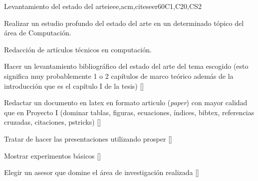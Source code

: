\begin{syllabus}
\begin{unit}{Levantamiento del estado del arte}{}{ieee,acm,citeseer}{60}{C1,C20,CS2}
  \begin{topics}
      \item Realizar un estudio profundo del estado del arte en un determinado tópico del área de Computación.
      \item Redacción de artículos técnicos en computación.
  \end{topics}
  \begin{learningoutcomes}
      \item Hacer un levantamiento bibliográfico del estado del arte del tema escogido (esto significa muy probablemente 1 o 2 capítulos de marco teórico además de la introducción que es el capítulo I de la tesis) [\Usage]
      \item Redactar un documento en latex en formato articulo (\emph{paper}) con mayor calidad que en Proyecto I (dominar tablas, figuras, ecuaciones, índices, bibtex, referencias cruzadas, citaciones, pstricks) [\Usage]
      \item Tratar de hacer las presentaciones utilizando prosper [\Usage]
      \item Mostrar experimentos básicos [\Usage]
      \item Elegir un asesor que domine el área de investigación realizada [\Usage]
   \end{learningoutcomes}
\end{unit}

\begin{coursebibliography}
\end{coursebibliography}

\end{syllabus}
